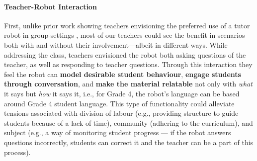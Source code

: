 \paragraph{Teacher-Robot Interaction} First, unlike prior work showing teachers envisioning the preferred use of a tutor robot in group-settings \cite{serholt2014teachers}, most of our teachers could see the benefit in scenarios both with and without their involvement---albeit in different ways. While addressing the class, teachers envisioned the robot both asking questions of the teacher, as well as responding to teacher questions. Through this interaction they feel the robot can \textbf{model desirable student behaviour}, \textbf{engage students through conversation}, and \textbf{make the material relatable} not only with \textit{what} it says but \textit{how} it says it, i.e., for Grade 4, the robot's language can be based around Grade 4 student language. This type of functionality could alleviate tensions associated with division of labour (e.g., providing structure to guide students because of a lack of time), community (adhering to the curriculum), and subject (e.g., a way of monitoring student progress --- if the robot answers questions incorrectly, students can correct it and the teacher can be a part of this process).


